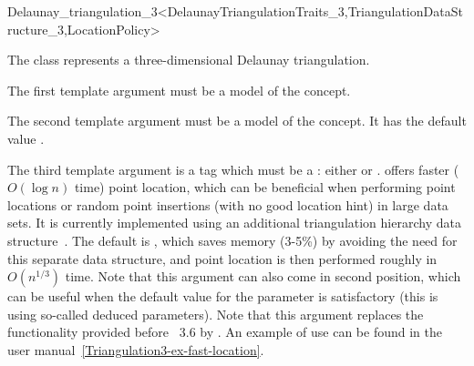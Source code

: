 

\begin{ccRefClass}{Delaunay_triangulation_3<DelaunayTriangulationTraits_3,TriangulationDataStructure_3,LocationPolicy>}

\ccDefinition
  
The class  represents a three-dimensional
Delaunay triangulation.


\ccParameters

The first template argument must be a model of the
 concept.

The second template argument must be a model of the
 concept.
It has the default value .

The third template argument is a tag which must be a  :
either  or .
 offers faster ($O(\log n)$ time) point
location, which can be beneficial when performing point locations or random
point insertions (with no good location hint) in large data sets.
It is currently implemented using an additional triangulation
hierarchy data structure~\cite{cgal:d-dh-02}.
The default is , which saves memory (3-5\%) by avoiding the need for this
separate data structure, and point location is then performed roughly in
$O(n^{1/3})$ time.
Note that this argument can also come in second position, which can be useful when
the default value for the  parameter is
satisfactory (this is using so-called deduced parameters).
Note that this argument replaces the functionality
provided before \cgal\ 3.6 by .
An example of use can be found in the user
manual~\ref{Triangulation3-ex-fast-location}.



\end{ccRefClass}
